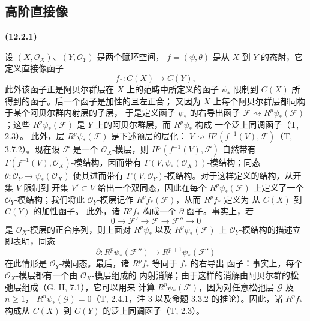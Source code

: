 \documentclass[UTF8,fontset=none,11pt,oneside,openany]{ctexbook}
\renewcommand{\leadsto}{\mathrel{\rightsquigarrow}}
\newenvironment{env}[1][]{%
  \par\medskip\noindent\textbf{(#1)}\ %
}{\par}
\let\EGAOriginalLabel\label
\renewcommand{\label}[1]{\phantomsection\EGAOriginalLabel{#1}}
\begin{document}
\subsection{高阶直接像}
\label{subsection:0.12.2-fr}
\begin{env}[12.2.1]
\label{0.12.2.1-fr}
设 $(X,\mathcal O_X)$、$(Y,\mathcal O_Y)$ 是两个赋环空间，
$f=(\psi,\theta)$ 是从 $X$ 到 $Y$ 的态射，它定义直接像函子
\[
f_*:C(X)\longrightarrow C(Y),
\]
此外该函子正是阿贝尔群层在 $X$ 上的范畴中所定义的函子
$\psi_*$ 限制到 $C(X)$ 所得到的函子。后一个函子是加性的且左正合；
又因为 $X$ 上每个阿贝尔群层都同构于某个阿贝尔群内射层的子层，
于是定义函子 $\psi_*$ 的右导出函子
$\mathcal F\leadsto R^p\psi_*(\mathcal F)$；这些
$R^p\psi_*(\mathcal F)$ 是 $Y$ 上的阿贝尔群层，而 $R^p\psi_*$ 构成
一个泛上同调函子（T, 2.3）。
此外，层 $R^p\psi_*(\mathcal F)$ 是下述预层的层化：
$V\leadsto H^p(f^{-1}(V),\mathcal F)$（T, 3.7.2）。现在设
$\mathcal F$ 是一个 $\mathcal O_X$-模层，则
$H^p(f^{-1}(V),\mathcal F)$ 自然带有
$\Gamma(f^{-1}(V),\mathcal O_X)$-模结构，因而带有
$\Gamma(V,\psi_*(\mathcal O_X))$-模结构；同态
$\theta:\mathcal O_Y\to\psi_*(\mathcal O_X)$ 使其进而带有
$\Gamma(V,\mathcal O_Y)$-模结构。对于这样定义的结构，从开集 $V$ 限制到
开集 $V'\subset V$ 给出一个双同态，因此在每个
$R^p\psi_*(\mathcal F)$ 上定义了一个 $\mathcal O_Y$-模结构；我们将此
$\mathcal O_Y$-模层记作 $R^p f_*(\mathcal F)$，从而 $R^p f_*$ 定义为
从 $C(X)$ 到 $C(Y)$ 的加性函子。
此外，诸 $R^p f_*$ 构成一个 $\partial$-函子。事实上，若
\[
0\longrightarrow\mathcal F'\longrightarrow\mathcal F
\longrightarrow\mathcal F''\longrightarrow0
\]
是 $\mathcal O_X$-模层的正合序列，则上面对 $R^p\psi_*$ 以及
$R^p\psi_*(\mathcal F)$ 上 $\mathcal O_Y$-模结构的描述立即表明，同态
\[
\partial:R^p\psi_*(\mathcal F'')\longrightarrow
R^{p+1}\psi_*(\mathcal F')
\]
在此情形是 $\mathcal O_Y$-模同态。最后，诸 $R^p f_*$ 等同于 $f_*$ 的右导出
函子：事实上，每个 $\mathcal O_X$-模层都有一个由 $\mathcal O_X$-模层组成的
内射消解；由于这样的消解由阿贝尔群的松弛层组成（G, II, 7.1），它可以用来
计算 $R^p\psi_*(\mathcal F)$，因为对任意松弛层 $\mathcal G$ 及 $n\geq1$，
$R^n\psi_*(\mathcal G)=0$（T, 2.4.1，注 3 以及命题
3.3.2 的推论）。因此，诸 $R^p f_*$ 构成从
$C(X)$ 到 $C(Y)$ 的泛上同调函子（T, 2.3）。
\end{env}
\end{document}
